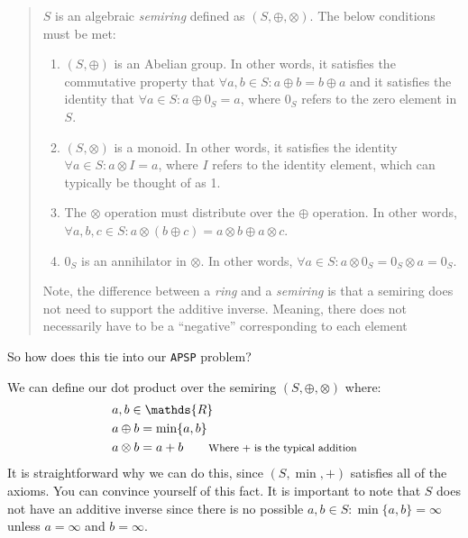 \documentclass[12pt]{article}
\begin{document}
\begin{quote}
    $S$ is an algebraic \emph{semiring} defined as $(S, \oplus, \otimes)$. The below conditions must be met:

    \begin{enumerate}
        \item $(S, \oplus)$ is an Abelian group. In other words, it satisfies the commutative property that $\forall a, b \in S : a \oplus b = b \oplus a$ and it satisfies the identity that $\forall a \in S : a \oplus 0_S = a$, where $0_S$ refers to the zero element in $S$.
        \item $(S, \otimes)$ is a monoid. In other words, it satisfies the identity $\forall a \in S : a \otimes I = a$, where $I$ refers to the identity element, which can typically be thought of as 1.
        \item The $\otimes$ operation must distribute over the $\oplus$ operation. In other words, $\forall a, b, c \in S : a \otimes (b \oplus c) = a \otimes b \oplus a \otimes c$.
        \item $0_S$ is an annihilator in $\otimes$. In other words, $\forall a \in S : a \otimes 0_S = 0_S \otimes a = 0_S$.
    \end{enumerate}

    {\footnotesize Note, the difference between a \emph{ring} and a \emph{semiring} is that a semiring does not need to support the additive inverse. Meaning, there does not necessarily have to be a ``negative'' corresponding to each element}
\end{quote}

So how does this tie into our \texttt{APSP} problem?

We can define our dot product over the semiring $(S, \oplus, \otimes)$ where:
\[
    \begin{split}
        & a, b \in \mathds{R} \\
        & a \oplus b = \min\{a, b\} \\
        & a \otimes b = a + b \qquad \text{{\footnotesize Where + is the typical addition}}
    \end{split}
\]
It is straightforward why we can do this, since $(S, \min, +)$ satisfies all of the axioms. You can convince yourself of this fact. It is important to note that $S$ does not have an additive inverse since there is no possible $a, b \in S : \min\{a, b\} = \infty$ unless $a = \infty$ and $b = \infty$.
\end{document}
